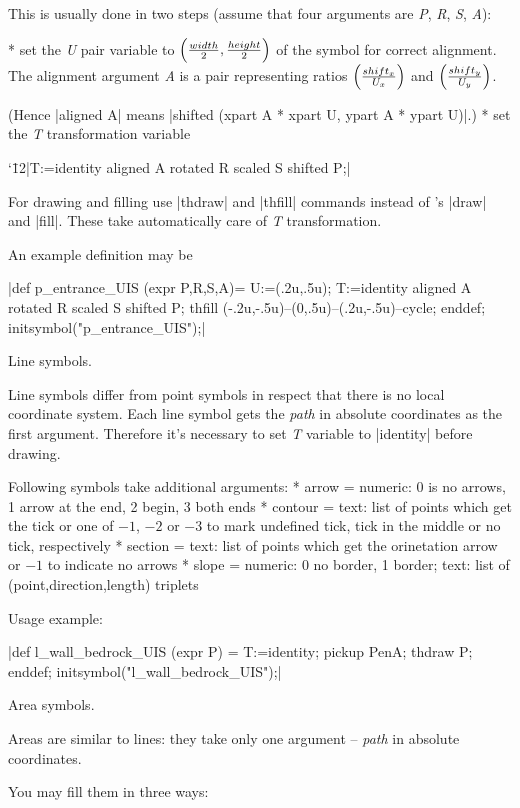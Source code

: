 This is usually done in two steps (assume that four arguments are 
{\it P}, {\it R}, {\it S}, {\it A}): 
  
\list
* set the {\it U} pair variable to $\left({width\over2},{height\over2}\right)$ 
  of the symbol for correct alignment. The alignment argument {\it A} is a pair 
  representing ratios $\left(shift_x\over U_x\right)$ and
  $\left(shift_y\over U_y\right)$. 
  
  (Hence |aligned A| means |shifted (xpart A * xpart U, ypart A * ypart U)|.)
* set the {\it T} transformation variable 

  {\catcode`\=12|T:=identity aligned A rotated R scaled S shifted P;|}
\endlist

For drawing and filling use |thdraw| and |thfill| commands instead of \MP's 
|draw| and |fill|. These take automatically care of {\it T} transformation.

An example definition may be

|def p_entrance_UIS (expr P,R,S,A)=
  U:=(.2u,.5u);
  T:=identity aligned A rotated R scaled S shifted P;
  thfill (-.2u,-.5u)--(0,.5u)--(.2u,-.5u)--cycle;
enddef;
initsymbol("p_entrance_UIS");|

\subsubchapter Line symbols.

Line symbols differ from point symbols in respect that there is no local 
coordinate system. Each line symbol gets the {\it path} in absolute coordinates 
as the first argument. Therefore it's necessary to set {\it T} variable to 
|identity| before drawing.

Following symbols take additional arguments: 
\list
* arrow = numeric: 0 is no arrows, 1 arrow at the end, 2 begin, 3 both ends
* contour = text: list of points which get the tick or one of 
  $-1$, $-2$ or $-3$ to mark undefined tick, tick in the middle or 
  no tick, respectively
* section = text: list of points which get the orinetation arrow or 
  $-1$ to indicate no arrows
* slope = numeric: 0 no border, 1 border; text: list of (point,direction,length) 
  triplets
\endlist

Usage example:

|def l_wall_bedrock_UIS (expr P) = 
  T:=identity;
  pickup PenA;
  thdraw P;
enddef;
initsymbol("l_wall_bedrock_UIS");|

\subsubchapter Area symbols.

Areas are similar to lines: they take only one argument -- {\it path} in 
absolute coordinates. 

You may fill them in three ways:

